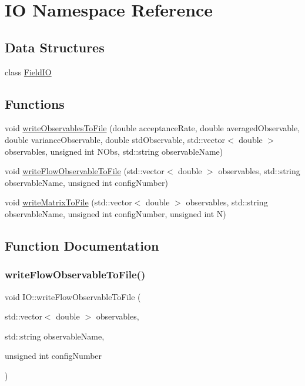 \hypertarget{namespace_i_o}{}\section{IO Namespace Reference}
\label{namespace_i_o}
\subsection*{Data Structures}
\begin{DoxyCompactItemize}
\item 
class \mbox{\hyperlink{class_i_o_1_1_field_i_o}{Field\+IO}}
\end{DoxyCompactItemize}
\subsection*{Functions}
\begin{DoxyCompactItemize}
\item 
void \mbox{\hyperlink{namespace_i_o_ad8cf5aef8f60d10b80292b69a091d5ac}{write\+Observables\+To\+File}} (double acceptance\+Rate, double averaged\+Observable, double variance\+Observable, double std\+Observable, std\+::vector$<$ double $>$ observables, unsigned int N\+Obs, std\+::string observable\+Name)
\item 
void \mbox{\hyperlink{namespace_i_o_a4f554804fd2ccd9c13c73777c5cbbf77}{write\+Flow\+Observable\+To\+File}} (std\+::vector$<$ double $>$ observables, std\+::string observable\+Name, unsigned int config\+Number)
\item 
void \mbox{\hyperlink{namespace_i_o_ad77b7dd770afc8e2eb433d6187ea3616}{write\+Matrix\+To\+File}} (std\+::vector$<$ double $>$ observables, std\+::string observable\+Name, unsigned int config\+Number, unsigned int N)
\end{DoxyCompactItemize}


\subsection{Function Documentation}
\mbox{\label{namespace_i_o_a4f554804fd2ccd9c13c73777c5cbbf77}} 
\subsubsection{\texorpdfstring{writeFlowObservableToFile()}{writeFlowObservableToFile()}}
{\footnotesize\ttfamily void I\+O\+::write\+Flow\+Observable\+To\+File (\begin{DoxyParamCaption}\item[{std\+::vector$<$ double $>$}]{observables,  }\item[{std\+::string}]{observable\+Name,  }\item[{unsigned int}]{config\+Number }\end{DoxyParamCaption})}


